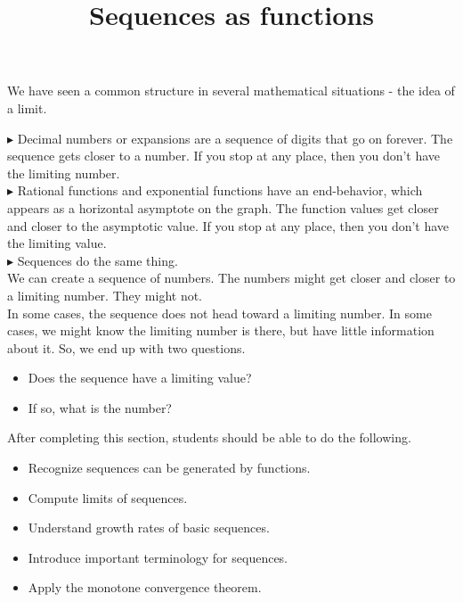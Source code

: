 \documentclass{ximera}
\title{Sequences as functions}
\begin{document}
\begin{abstract}
\end{abstract}

\maketitle




We have seen a common structure in several mathematical situations - the idea of a limit.


$\blacktriangleright$ Decimal numbers or expansions are a sequence of digits that go on forever.  The sequence gets closer to a number. If you stop at any place, then you don't have the limiting number. \\


$\blacktriangleright$ Rational functions and exponential functions have an end-behavior, which appears as a horizontal asymptote on the graph.  The function values get closer and closer to the asymptotic value.  If you stop at any place, then you don't have the limiting value. \\


$\blacktriangleright$ Sequences do the same thing. \\


We can create a sequence of numbers. The numbers might get closer and closer to a limiting number.  They might not. \\




In some cases, the sequence does not head toward a limiting number. In some cases, we might know the limiting number is there, but have little information about it.  So, we end up with two questions.



\begin{itemize}
\item Does the sequence have a limiting value?
\item If so, what is the number?
\end{itemize}













\begin{sectionOutcomes}

After completing this section, students should be able to do the following.

\begin{itemize}
\item{Recognize sequences can be generated by functions.}
\item{Compute limits of sequences.}
\item{Understand growth rates of basic sequences.}
\item{Introduce important terminology for sequences.}
\item{Apply the monotone convergence theorem.}
\end{itemize}

\end{sectionOutcomes}
\end{document}
